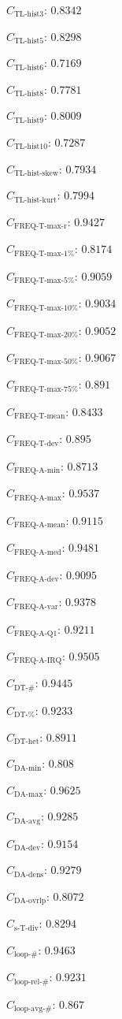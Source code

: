 \documentclass[a4paper]{article}
\newcommand{\tlhistthreename}{\text{TL-hist3}}
\newcommand{\tlhistthree}{C_{\tlhistthreename}}
\newcommand{\tlhistfivename}{\text{TL-hist5}}
\newcommand{\tlhistfive}{C_{\tlhistfivename}}
\newcommand{\tlhistsixname}{\text{TL-hist6}}
\newcommand{\tlhistsix}{C_{\tlhistsixname}}
\newcommand{\tlhisteightname}{\text{TL-hist8}}
\newcommand{\tlhisteight}{C_{\tlhisteightname}}
\newcommand{\tlhistninename}{\text{TL-hist9}}
\newcommand{\tlhistnine}{C_{\tlhistninename}}
\newcommand{\tlhisttenname}{\text{TL-hist10}}
\newcommand{\tlhistten}{C_{\tlhisttenname}}
\newcommand{\tlskewhistname}{\text{TL-hist-skew}}
\newcommand{\tlskewhist}{C_{\tlskewhistname}}
\newcommand{\tlkurthistname}{\text{TL-hist-kurt}}
\newcommand{\tlkurthist}{C_{\tlkurthistname}}
\newcommand{\freqmaxrname}{\text{FREQ-T-max-r}}
\newcommand{\freqmaxr}{C_{\freqmaxrname}}
\newcommand{\freqmaxonename}{\text{FREQ-T-max-1\%}}
\newcommand{\freqmaxone}{C_{\freqmaxonename}}
\newcommand{\freqmaxfivename}{\text{FREQ-T-max-5\%}}
\newcommand{\freqmaxfive}{C_{\freqmaxfivename}}
\newcommand{\freqmaxtenname}{\text{FREQ-T-max-10\%}}
\newcommand{\freqmaxten}{C_{\freqmaxtenname}}
\newcommand{\freqmaxtwentyname}{\text{FREQ-T-max-20\%}}
\newcommand{\freqmaxtwenty}{C_{\freqmaxtwentyname}}
\newcommand{\freqmaxfiftyname}{\text{FREQ-T-max-50\%}}
\newcommand{\freqmaxfifty}{C_{\freqmaxfiftyname}}
\newcommand{\freqmaxseventyfivename}{\text{FREQ-T-max-75\%}}
\newcommand{\freqmaxseventyfive}{C_{\freqmaxseventyfivename}}
\newcommand{\freqmeanname}{\text{FREQ-T-mean}}
\newcommand{\freqmean}{C_{\freqmeanname}}
\newcommand{\freqdevname}{\text{FREQ-T-dev}}
\newcommand{\freqdev}{C_{\freqdevname}}
\newcommand{\actfreqminname}{\text{FREQ-A-min}}
\newcommand{\actfreqmin}{C_{\actfreqminname}}
\newcommand{\actfreqmaxname}{\text{FREQ-A-max}}
\newcommand{\actfreqmax}{C_{\actfreqmaxname}}
\newcommand{\actfreqmeanname}{\text{FREQ-A-mean}}
\newcommand{\actfreqmean}{C_{\actfreqmeanname}}
\newcommand{\actfreqmedianname}{\text{FREQ-A-med}}
\newcommand{\actfreqmedian}{C_{\actfreqmedianname}}
\newcommand{\actfreqdevname}{\text{FREQ-A-dev}}
\newcommand{\actfreqdev}{C_{\actfreqdevname}}
\newcommand{\actfreqvarname}{\text{FREQ-A-var}}
\newcommand{\actfreqvar}{C_{\actfreqvarname}}
\newcommand{\actfreqqonename}{\text{FREQ-A-Q1}}
\newcommand{\actfreqqone}{C_{\actfreqqonename}}
\newcommand{\actfreqiqrname}{\text{FREQ-A-IRQ}}
\newcommand{\actfreqiqr}{C_{\actfreqiqrname}}
\newcommand{\numberuniquetracesname}{\text{DT-\#}}
\newcommand{\numberuniquetraces}{C_{\numberuniquetracesname}}
\newcommand{\percentageuniquetracesname}{\text{DT-\%}}
\newcommand{\percentageuniquetraces}{C_{\percentageuniquetracesname}}
\newcommand{\dthetname}{\text{DT-het}}
\newcommand{\dthet}{C_{\dthetname}}
\newcommand{\daminname}{\text{DA-min}}
\newcommand{\damin}{C_{\daminname}}
\newcommand{\daavgname}{\text{DA-avg}}
\newcommand{\daavg}{C_{\daavgname}}
\newcommand{\damaxname}{\text{DA-max}}
\newcommand{\damax}{C_{\damaxname}}
\newcommand{\dadevname}{\text{DA-dev}}
\newcommand{\dadev}{C_{\dadevname}}
\newcommand{\dadensname}{\text{DA-dens}}
\newcommand{\dadens}{C_{\dadensname}}
\newcommand{\daoverlapname}{\text{DA-ovrlp}}
\newcommand{\daoverlap}{C_{\daoverlapname}}
\newcommand{\simpletracedivname}{\text{s-T-div}}
\newcommand{\simpletracediv}{C_{\simpletracedivname}}
\newcommand{\loopnumname}{\text{loop-\#}}
\newcommand{\loopnum}{C_{\loopnumname}}
\newcommand{\looprelnumname}{\text{loop-rel-\#}}
\newcommand{\looprelnum}{C_{\looprelnumname}}
\newcommand{\loopavgname}{\text{loop-avg-\#}}
\newcommand{\loopavg}{C_{\loopavgname}}
\begin{document}
\begin{compactitem}
\item $\tlhistthree$: $0.8342$
\item $\tlhistfive$: $0.8298$
\item $\tlhistsix$: $0.7169$
\item $\tlhisteight$: $0.7781$
\item $\tlhistnine$: $0.8009$
\item $\tlhistten$: $0.7287$
\item $\tlskewhist$: $0.7934$
\item $\tlkurthist$: $0.7994$
\item $\freqmaxr$: $0.9427$
\item $\freqmaxone$: $0.8174$
\item $\freqmaxfive$: $0.9059$
\item $\freqmaxten$: $0.9034$
\item $\freqmaxtwenty$: $0.9052$
\item $\freqmaxfifty$: $0.9067$
\item $\freqmaxseventyfive$: $0.891$
\item $\freqmean$: $0.8433$
\item $\freqdev$: $0.895$
\item $\actfreqmin$: $0.8713$
\item $\actfreqmax$: $0.9537$
\item $\actfreqmean$: $0.9115$
\item $\actfreqmedian$: $0.9481$
\item $\actfreqdev$: $0.9095$
\item $\actfreqvar$: $0.9378$
\item $\actfreqqone$: $0.9211$
\item $\actfreqiqr$: $0.9505$
\item $\numberuniquetraces$: $0.9445$
\item $\percentageuniquetraces$: $0.9233$
\item $\dthet$: $0.8911$
\item $\damin$: $0.808$
\item $\damax$: $0.9625$
\item $\daavg$: $0.9285$
\item $\dadev$: $0.9154$
\item $\dadens$: $0.9279$
\item $\daoverlap$: $0.8072$
\item $\simpletracediv$: $0.8294$
\item $\loopnum$: $0.9463$
\item $\looprelnum$: $0.9231$
\item $\loopavg$: $0.867$

\end{compactitem}
\end{document}
